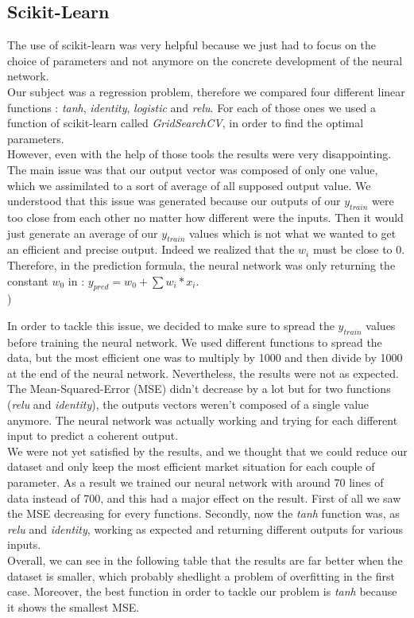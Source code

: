 \documentclass[]{article}
\begin{document}
\subsection{Scikit-Learn}
\vskip 0.3cm
The use of scikit-learn was very helpful because we just had to focus on the choice of parameters and not anymore on the concrete development of the neural network.\\
Our subject was a regression problem, therefore we compared four different linear functions : \textit{tanh}, \textit{identity}, \textit{logistic} and \textit{relu}.
For each of those ones we used a function of scikit-learn called \textit{GridSearchCV}, in order to find the optimal parameters. \\
However, even with the help of those tools the results were very disappointing. The main issue was that our output vector was composed of only one value, which we assimilated to a sort of average of all supposed output value. We understood that this issue was generated because our outputs of our $y_{train}$ were too close from each other no matter how different were the inputs. Then it would just generate an average of our $y_{train}$ values which is not what we wanted to get an efficient and precise output.  Indeed we realized that the \(w_{i}\) must be close to 0. Therefore, in the prediction formula, the neural network was only returning the constant \(w_{0}\) in : \(y_{pred} = w_{0} + \sum w_{i}*x_{i}\).\\)

In order to tackle this issue, we decided to make sure to spread the \(y_{train}\) values before training the neural network. We used different functions to spread the data, but the most efficient one was to multiply by 1000 and then divide by 1000 at the end of the neural network. Nevertheless, the results were not as expected. The Mean-Squared-Error (MSE) didn't decrease by a lot but for two functions (\textit{relu} and \textit{identity}), the outputs vectors weren't composed of a single value anymore. The neural network was actually working and trying for each different input to predict a coherent output.\\
We were not yet satisfied by the results, and we thought that we could reduce our dataset and only keep the most efficient market situation for each couple of parameter. As a result we trained our neural network with around 70 lines of data instead of 700, and this had a major effect on the result. First of all we saw the MSE decreasing for every functions. Secondly, now the \textit{tanh} function was, as \textit{relu} and \textit{identity}, working as expected and returning different outputs for various inputs. \\
Overall, we can see in the following table that the results are far better when the dataset is smaller, which probably shedlight a problem of overfitting in the first case. Moreover, the best function in order to tackle our problem is \textit{tanh} because it shows the smallest MSE.\\
\end{document}
